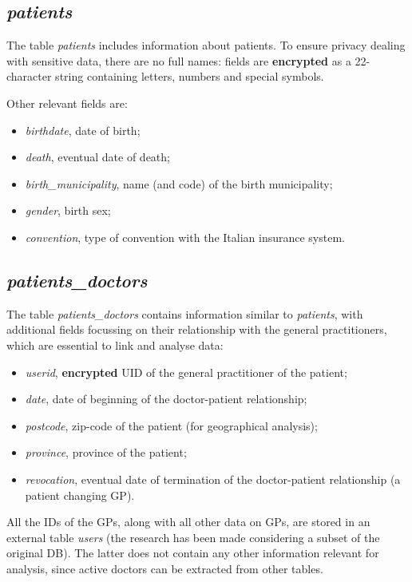 \subsection{\textit{patients}}
The table \textit{patients} includes information about patients. To ensure privacy dealing with sensitive data, there are no full names: fields are \textbf{encrypted} as a 22-character string containing letters, numbers and special symbols.

Other relevant fields are:
\begin{itemize}
	\item \textit{birthdate}, date of birth;
	\item \textit{death}, eventual date of death;
	\item \textit{birth\_municipality}, name (and code) of the birth municipality;
	\item \textit{gender}, birth sex;
	\item \textit{convention}, type of convention with the Italian insurance system.
\end{itemize}

\subsection{\textit{patients\_doctors}}
The table \textit{patients\_doctors} contains information similar to \textit{patients}, with additional fields focussing on their relationship with the general practitioners, which are essential to link and analyse data:
\begin{itemize}
	\item \textit{userid}, \textbf{encrypted} UID of the general practitioner of the patient;
	\item \textit{date}, date of beginning of the doctor-patient relationship;
	\item \textit{postcode}, zip-code of the patient (for geographical analysis);
	\item \textit{province}, province of the patient;
	\item \textit{revocation}, eventual date of termination of the doctor-patient relationship (a patient changing GP).
\end{itemize}

All the IDs of the GPs, along with all other data on GPs, are stored in an external table \textit{users} (the research has been made considering a subset of the original DB). The latter does not contain any other information relevant for analysis, since active doctors can be extracted from other tables.

